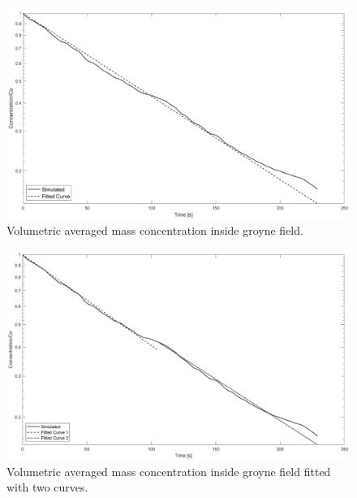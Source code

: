 \begin{figure}[!ht]
\centering
\includegraphics[width=\linewidth]{../images/art1/imgMassExchange6.png}
\caption{Volumetric averaged mass concentration inside groyne field.}
\label{fig:art1:massGraph1}
\end{figure}
\begin{figure}[!ht]
\centering
\includegraphics[width=\linewidth]{../images/art1/imgMassExchange7.png}
\caption{Volumetric averaged mass concentration inside groyne field fitted with two curves.}
\label{fig:art1:massGraph2}
\end{figure}
